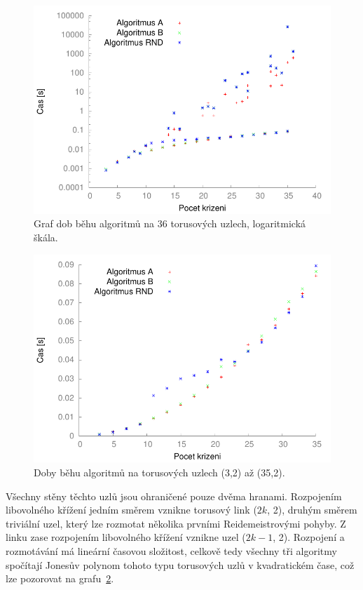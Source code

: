 \begin{figure}[p]\centering
\includegraphics{../img/torusSrov}
\caption{Graf dob běhu algoritmů na 36 torusových uzlech, logaritmická škála.}
\label{obr03:torusSrov}
\end{figure}

\begin{figure}[p]\centering
\includegraphics{../img/torus2}
\caption{Doby běhu algoritmů na torusových uzlech (3,2) až (35,2).}
\label{obr03:torus2}
\end{figure}

Všechny stěny těchto uzlů jsou ohraničené pouze dvěma hranami. Rozpojením libovolného křížení jedním směrem vznikne torusový link ($2k$, 2), druhým směrem triviální uzel, který lze rozmotat několika prvními Reidemeistrovými pohyby. Z linku zase rozpojením libovolného křížení vznikne uzel ($2k-1$, 2). Rozpojení a rozmotávání má lineární časovou složitost, celkově tedy všechny tři algoritmy spočítají Jonesův polynom tohoto typu torusových uzlů v kvadratickém čase, což lze pozorovat na grafu~\ref{obr03:torus2}.

